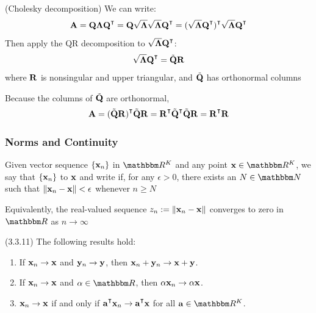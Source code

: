 \begin{frame}

    \vspace{2em}
    \Prf (Cholesky decomposition)
    We can write:
        \begin{equation*}
            \boldA 
            = \boldQ \boldLambda \boldQ^\T
            = \boldQ \sqrt{\boldLambda} \sqrt{ \boldLambda} \boldQ^\T
            = (\sqrt{ \boldLambda} \boldQ^\T)^\T \sqrt{ \boldLambda} \boldQ^\T
        \end{equation*}
    Then apply the QR decomposition to $\sqrt{ \boldLambda} \boldQ^\T$:
        $$\sqrt{ \boldLambda} \boldQ^\T = \tilde \boldQ \boldR$$
    where $\mathbf R$ is nonsingular and upper triangular, and $\tilde {\mathbf Q}$ has
    orthonormal columns
    
    \vspace{.7em}
    Because the columns of $\tilde {\mathbf Q}$ are orthonormal,
        \begin{equation*}
        \boldA 
        = (\tilde \boldQ \boldR)^\T \tilde \boldQ \boldR
        =  \boldR^\T \tilde \boldQ^\T \tilde \boldQ \boldR
        =  \boldR^\T \boldR
        \end{equation*}
    
\end{frame}


\begin{frame}

    \vspace{2em}
    \frametitle{Norms and Continuity}
    
    Given vector sequence $\{{\mathbf x}_n\}$ in $\RR^K$ and any point $\boldx \in \RR^K$, we say that $\{{\mathbf x}_n\}$  to ${\mathbf x}$ and write
     if, for any $\epsilon > 0$, there exists an $N
    \in \NN$ such that $\|{\mathbf x}_n - {\mathbf x}\| < \epsilon$ whenever $n \geq N$
    
    \vspace{.7em}
    Equivalently, the real-valued sequence $z_n := \|{\mathbf x}_n - {\mathbf x}\|$
    converges to zero in $\RR$ as $n \to \infty$

\end{frame}

\begin{frame}
    
    \vspace{2em}
    \Fact (3.3.11)
    The following results hold:
    \begin{enumerate}
        \item If ${\mathbf x}_n \to {\mathbf x}$ and ${\mathbf y}_n \to {\mathbf y}$, then ${\mathbf x}_n +
            {\mathbf y}_n \to {\mathbf x} +  {\mathbf y}$.
        \item If ${\mathbf x}_n \to {\mathbf x}$ and $\alpha \in \RR$, then $\alpha {\mathbf x}_n 
            \to \alpha {\mathbf x}$.
        \item ${\mathbf x}_n \to {\mathbf x}$ if and only if $\bolda^\T \boldx_n \to
            \bolda^\T \boldx$ for all $\bolda \in \RR^K$.
    \end{enumerate}


\end{frame}

